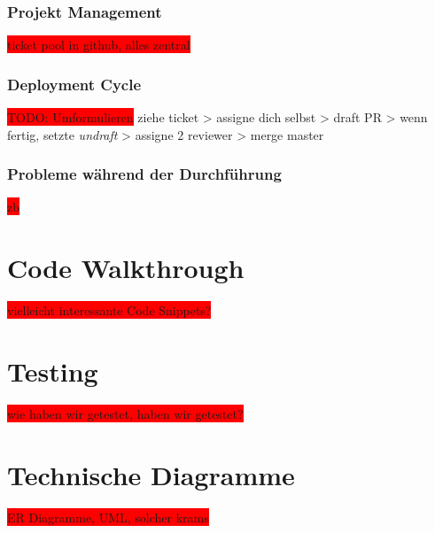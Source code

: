\documentclass[10pt, a4paper, draft]{article}
\begin{document}
\subsubsection{Projekt Management}
\colorbox{red}{ticket pool in github, alles zentral}

\subsubsection{Deployment Cycle}
\colorbox{red}{TODO: Umformulieren} ziehe ticket > assigne dich selbst > draft PR > wenn fertig, setzte \textit{undraft} > assigne 2 reviewer > merge master

\subsubsection{Probleme während der Durchführung}
\colorbox{red}{zb }
\section{Code Walkthrough}
\colorbox{red}{vielleicht interessante Code Snippets?}
\section{Testing}
\colorbox{red}{wie haben wir getestet, haben wir getestet?}
\section{Technische Diagramme}
\colorbox{red}{ER Diagramme, UML, solcher krams}
 
\end{document}
